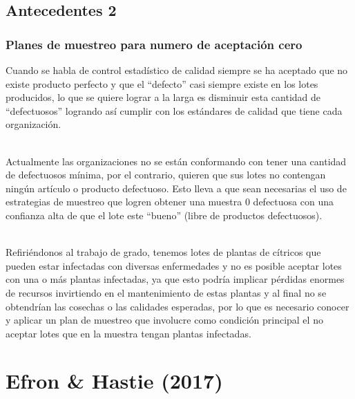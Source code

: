\documentclass[10pt]{beamer}
\begin{document}
\subsection{Antecedentes 2}
\begin{frame}
\frametitle{Planes de muestreo para numero de aceptación cero}
Cuando se habla de control estadístico de calidad siempre se ha aceptado que no existe producto perfecto y que el ``defecto'' casi siempre existe en los lotes producidos, lo que se quiere lograr a la larga es disminuir esta cantidad de ``defectuosos'' logrando así cumplir con los estándares de calidad que tiene cada organización. 

~\\Actualmente las organizaciones no se están conformando con tener una cantidad de defectuosos mínima, por el contrario, quieren que sus lotes no contengan ningún artículo o producto defectuoso. Esto lleva a que sean necesarias el uso de estrategias de muestreo que logren obtener una muestra 0 defectuosa con una confianza alta de que el lote este ``bueno'' (libre de productos defectuosos).

~\\Refiriéndonos al trabajo de grado, tenemos lotes de plantas de cítricos que pueden estar infectadas con diversas enfermedades y no es posible aceptar lotes con una o más plantas infectadas, ya que esto podría implicar pérdidas enormes de recursos invirtiendo en el mantenimiento de estas plantas y al final no se obtendrían las cosechas o las calidades esperadas, por lo que es necesario conocer y aplicar un plan de muestreo que involucre como condición principal el no aceptar lotes que en la muestra tengan plantas infectadas.
\end{frame}

\section{Efron \& Hastie (2017)}
\end{document}

